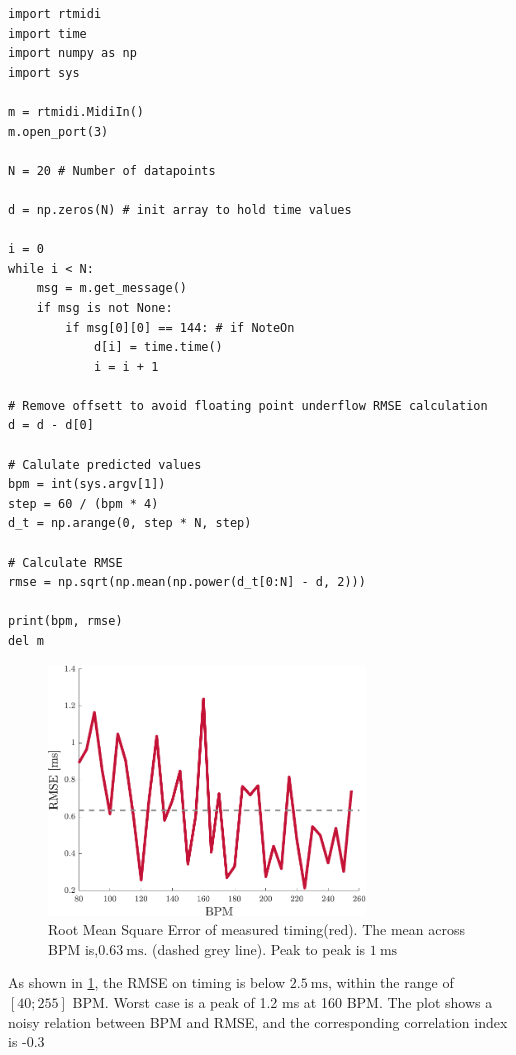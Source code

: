\begin{lstlisting}[caption={Python script to log timing of incoming midi messages with the RT-midi library, and calculate RMSE },label={lst:pythonscript}]
import rtmidi
import time
import numpy as np
import sys

m = rtmidi.MidiIn()
m.open_port(3)

N = 20 # Number of datapoints

d = np.zeros(N) # init array to hold time values

i = 0
while i < N:
	msg = m.get_message()
	if msg is not None:
		if msg[0][0] == 144: # if NoteOn
			d[i] = time.time()
			i = i + 1

# Remove offsett to avoid floating point underflow RMSE calculation 
d = d - d[0]

# Calulate predicted values
bpm = int(sys.argv[1])
step = 60 / (bpm * 4)
d_t = np.arange(0, step * N, step)

# Calculate RMSE
rmse = np.sqrt(np.mean(np.power(d_t[0:N] - d, 2))) 

print(bpm, rmse)
del m

\end{lstlisting}

\begin{figure}[H]
    \centering
    \includegraphics[width=0.75\textwidth]{graphics/RMSE-crop.pdf}
    \caption{Root Mean Square Error of measured timing(red). The mean across BPM is,$\SI{0.63}{\milli\second}.$ (dashed grey line). Peak to peak is $\SI{1}{\milli\second}$ }
    \label{fig:RMSE}
\end{figure}

As shown in \cref{fig:RMSE}, the RMSE on timing is below $\SI{2.5}{\milli\second}$, within the range of $[40;255]$ BPM. Worst case is a peak of 1.2 ms at 160 BPM. The plot shows a noisy relation between BPM and RMSE, and the corresponding correlation index is -0.3\\

